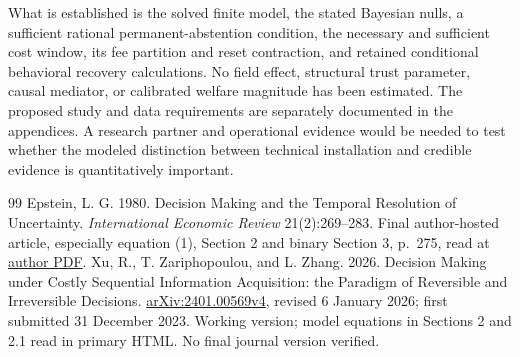 \documentclass[11pt]{article}
\begin{document}
What is established is the solved finite model, the stated Bayesian nulls, a sufficient rational permanent-abstention condition, the necessary and sufficient cost window, its fee partition and reset contraction, and retained conditional behavioral recovery calculations. No field effect, structural trust parameter, causal mediator, or calibrated welfare magnitude has been estimated. The proposed study and data requirements are separately documented in the appendices. A research partner and operational evidence would be needed to test whether the modeled distinction between technical installation and credible evidence is quantitatively important.


{
\small
\setlength{\parindent}{0pt}
\begin{thebibliography}{99}\small
{} Epstein, L. G. 1980. Decision Making and the Temporal Resolution of Uncertainty. \emph{International Economic Review} 21(2):269--283. Final author-hosted article, especially equation (1), Section 2 and binary Section 3, p.~275, read at \href{https://people.bu.edu/lepstein/files-research/Epstein-Irreversibility-IER1980.pdf}{author PDF}.
 Xu, R., T. Zariphopoulou, and L. Zhang. 2026. Decision Making under Costly Sequential Information Acquisition: the Paradigm of Reversible and Irreversible Decisions. \href{https://arxiv.org/abs/2401.00569v4}{arXiv:2401.00569v4}, revised 6 January 2026; first submitted 31 December 2023. Working version; model equations in Sections 2 and 2.1 read in primary HTML. No final journal version verified.


\end{thebibliography}}
\end{document}
